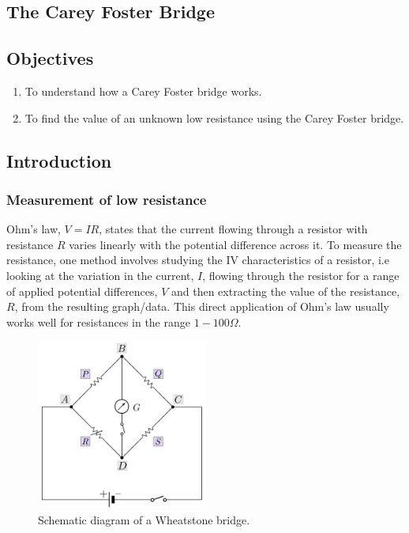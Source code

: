 \begin{refsection}
\chapter{The Carey Foster Bridge}

\section*{Objectives}

\begin{enumerate}
\item To understand how a Carey Foster bridge works.
\item To find the value of an unknown low resistance using the Carey Foster bridge.
\end{enumerate}


\section*{Introduction}
\subsection*{Measurement of low resistance} 
Ohm's law, $V=IR$, states that the current flowing through a resistor with resistance $R$ varies linearly with the potential difference across it.
To measure the resistance, one method involves studying the IV characteristics of a resistor, i.e looking at the variation in the current, $I$, flowing through the resistor for a range of applied potential differences, $V$ and then extracting the value of the resistance, $R$, from the resulting graph/data. This direct application of Ohm's law usually works well for resistances in the range $1-100 \Omega$. 

\begin{figure}[!htb]
    \centering
    \includegraphics[width=0.5\textwidth]{figs/wheatstone.png}
    \caption{Schematic diagram of a Wheatstone bridge.}
    \label{fig:wheatstone}
\end{figure}


\end{refsection}
